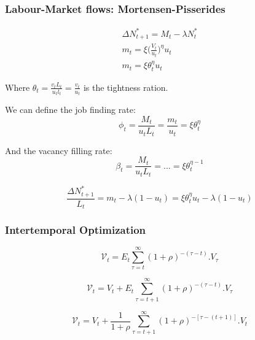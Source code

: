 \subsubsection{Labour-Market flows: Mortensen-Pisserides}
\begin{equation*}
\begin{aligned}
    \Delta N_{t+1}^{*}=M_{t} -\lambda N_{t}^{*} \\
    m_{t}=\xi\big(\frac{V_{t}}{u_{t}}\big)^{\eta}u_{t} \\
    m_{t}=\xi\theta_{t}^{\eta}u_{t}
\end{aligned}  
\end{equation*}

Where $\theta_{t}=\frac{v_{t}L_{t}}{u_{t}l_{t}}=\frac{v_{t}}{u_{t}}$ is the tightness ration.

We can define the job finding rate:
\begin{equation}\label{JFR}
    \phi_{t}=\frac{M_{t}}{u_{t}L_{t}}=\frac{m_{t}}{u_{t}}=\xi \theta_{t}^{\eta}
\end{equation}

And the vacancy filling rate: 
\begin{equation}\label{VFR}
    \beta_{t}=\frac{M_{t}}{u_{t}L_{t}}=...=\xi\theta_{t}^{\eta-1}
\end{equation}

\begin{equation*}
    \frac{\Delta N_{t+1}^{*}}{L_{t}}=m_{t}-\lambda(1-u_{t})=\xi\theta_{t}^{\eta}u_{t}-\lambda(1-u_{t})
\end{equation*}

\subsubsection{Intertemporal Optimization}

\begin{equation*}
    \mathcal{V}_{t}=E_{t}\sum_{\tau=t}^{\infty}(1+\rho)^{-(\tau-t)}.V_{\tau} 
\end{equation*}

\begin{equation*}
    \mathcal{V}_{t}=V_{t}+E_{t}\sum_{\tau=t+1}^{\infty}(1+\rho)^{-(\tau-t)}.V_{\tau} 
\end{equation*}

\begin{equation*}
    \mathcal{V}_{t}=V_{t}+\frac{1}{1+\rho}\sum_{\tau=t+1}^{\infty}(1+\rho)^{-[\tau-(t+1)]}.V_{t} 
\end{equation*}

